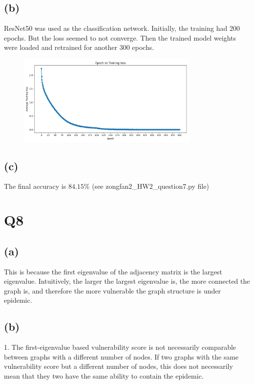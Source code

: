 \documentclass[]{article}
\begin{document}
\subsection*{(b)}
ResNet50 was used as the classification network. 
Initially, the training had 200 epochs. But the loss seemed to not converge. Then the trained model weights were loaded and retrained for another 300 epochs.

\begin{figure}[!ht]
    \centering
    \includegraphics[width=0.8\textwidth]{fig/hw2_q7.png}
\end{figure}


\subsection*{(c)}
The final accuracy is $84.15\%$ (see zongfan2\_HW2\_question7.py file)


\newpage

\section*{Q8}

\subsection*{(a)}
This is because the first eigenvalue of the adjacency matrix is the largest eigenvalue. Intuitively, the larger the largest eigenvalue is, the more connected the graph is, and therefore the more vulnerable the graph structure is under epidemic.

\subsection*{(b)}

1. The first-eigenvalue based vulnerability score is not necessarily comparable between graphs with a different number of nodes. If two graphs with the same vulnerability score but a different number of nodes, this does not necessarily mean that they two have the same ability to contain the epidemic. 
\end{document}
